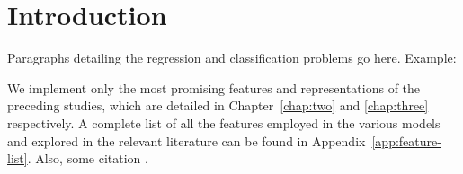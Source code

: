 \chapter{Introduction}
\label{chap:one}

Paragraphs detailing the regression and classification problems go here.
Example:

We implement only the most promising features and representations of the
preceding studies, which are detailed in Chapter~\ref{chap:two} and
\ref{chap:three} respectively.  A complete list of all the features employed in
the various models and explored in the relevant literature can be found in
Appendix~\ref{app:feature-list}.  Also, some citation \citet{bishop:2006}.

